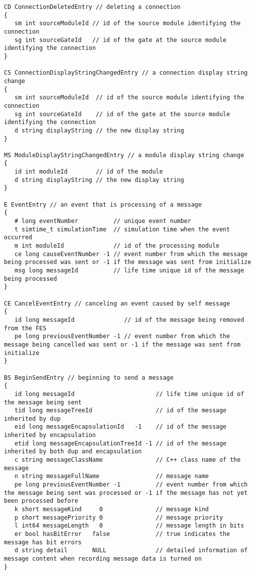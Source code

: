 \begin{verbatim}
CD ConnectionDeletedEntry // deleting a connection
{
   sm int sourceModuleId // id of the source module identifying the connection
   sg int sourceGateId   // id of the gate at the source module identifying the connection
}

CS ConnectionDisplayStringChangedEntry // a connection display string change
{
   sm int sourceModuleId  // id of the source module identifying the connection
   sg int sourceGateId    // id of the gate at the source module identifying the connection
   d string displayString // the new display string
}

MS ModuleDisplayStringChangedEntry // a module display string change
{
   id int moduleId        // id of the module
   d string displayString // the new display string
}

E EventEntry // an event that is processing of a message
{
   # long eventNumber          // unique event number
   t simtime_t simulationTime  // simulation time when the event occurred
   m int moduleId              // id of the processing module
   ce long causeEventNumber -1 // event number from which the message being processed was sent or -1 if the message was sent from initialize
   msg long messageId          // life time unique id of the message being processed
}

CE CancelEventEntry // canceling an event caused by self message
{
   id long messageId              // id of the message being removed from the FES
   pe long previousEventNumber -1 // event number from which the message being cancelled was sent or -1 if the message was sent from initialize
}

BS BeginSendEntry // beginning to send a message
{
   id long messageId                       // life time unique id of the message being sent
   tid long messageTreeId                  // id of the message inherited by dup
   eid long messageEncapsulationId   -1    // id of the message inherited by encapsulation
   etid long messageEncapsulationTreeId -1 // id of the message inherited by both dup and encapsulation
   c string messageClassName               // C++ class name of the message
   n string messageFullName                // message name
   pe long previousEventNumber -1          // event number from which the message being sent was processed or -1 if the message has not yet been processed before
   k short messageKind     0               // message kind
   p short messagePriority 0               // message priority
   l int64 messageLength   0               // message length in bits
   er bool hasBitError   false             // true indicates the message has bit errors
   d string detail       NULL              // detailed information of message content when recording message data is turned on
}


\end{verbatim}
